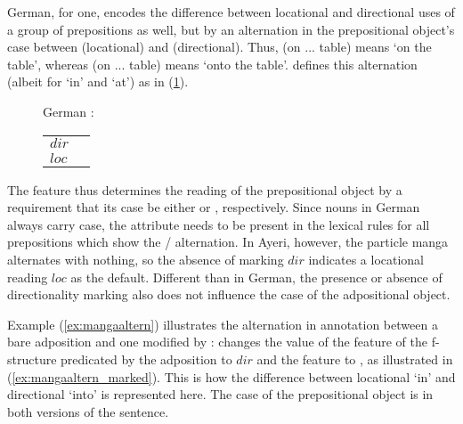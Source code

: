 German, for one, encodes the difference between locational and directional uses
of a group of prepositions as well, but by an alternation in the prepositional
object's case between \Dat{} (locational) and \Acc{} (directional). Thus,
 (on \Def{}.\Dat{}.\M{}.\Sg{} table) means `on the table',
whereas  (on \Def{}.\Acc{}.\M {}.\Sg{} table) means `onto the
table'. \citet{butt2005} defines this alternation (albeit for  `in' and
 `at') as in (\ref{ex:gercasealt}).

\begin{figure}[h]
\ex\label{ex:gercasealt}%
German \citep{butt2005}:\medskip\\
\begin{tabular}[t]{@{} l @{ $\implies$ } l}
\PSem{} $dir$ & \ups{\Obj{} \Case{}} \req{} \Acc{} \\
\PSem{} $loc$ & \ups{\Obj{} \Case{}} \req{} \Dat{} \\
\end{tabular}
\xe
\end{figure}

The \PSem{} feature thus determines the reading of the prepositional object by
a requirement that its case be either \Acc{} or \Dat{}, respectively.
Since nouns in German always carry case, the \PSem{} attribute needs to be
present in the lexical rules for all prepositions which show the \Acc{}/\Dat{}
alternation. %
In Ayeri, however, the particle  {manga} alternates with nothing, so
the absence of marking $dir$ indicates a locational reading $loc$ as the
default. Different than in German, the presence or absence of directionality
marking also does not influence the case of the adpositional object.

Example (\ref{ex:mangaaltern}) illustrates the alternation in annotation
between a bare adposition and one modified by :
 changes the value of the \PSem{} feature of the f-structure
predicated by the adposition to $dir$ and the \PCase{} feature to ,
as illustrated in (\ref{ex:mangaaltern_marked}). This is how the difference
between locational `in' and directional `into' is represented here. The case of
the prepositional object is \Loc{} in both versions of the sentence.

